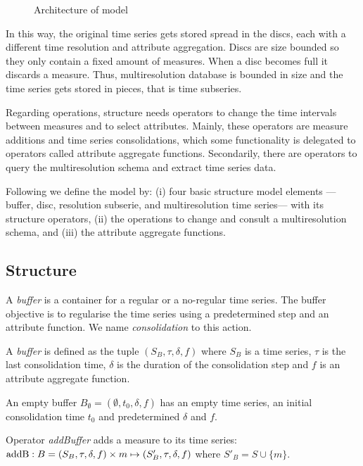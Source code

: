 \begin{figure}
  \centering
  
  \caption{Architecture of  model}
  \label{fig:model:mtsdb}
\end{figure}


In this way, the original time series gets stored spread in the discs,
each with a different time resolution and attribute aggregation.
Discs are size bounded so they only contain a fixed amount of
measures. When a disc becomes full it discards a measure. Thus,
multiresolution database is bounded in size and the time series gets
stored in pieces, that is time subseries.

Regarding operations,  structure needs operators to change
the time intervals between measures and to select attributes. Mainly,
these operators are measure additions and time series consolidations,
which some functionality is delegated to operators called attribute
aggregate functions. Secondarily, there are operators to query the
multiresolution schema and extract time series data.


Following we define the  model by: (i) four basic
structure model elements ---buffer, disc, resolution subserie, and
multiresolution time series--- with its structure operators, (ii) the
operations to change and consult a multiresolution schema, and (iii)
the attribute aggregate functions.



\subsection{Structure}

A \emph{buffer} is a container for a regular or a no-regular time
series. The buffer objective is to regularise the time series using a
predetermined step and an attribute function. We name
\emph{consolidation} to this action.
\begin{definition}[Buffer]
  A \emph{buffer} is defined as the tuple $(S_B,\tau,\delta,f)$ where
  $S_B$ is a time series, $\tau$ is the last consolidation time,
  $\delta$ is the duration of the consolidation step and $f$ is an
  attribute aggregate function.

  An empty buffer $B_{\emptyset} = (\emptyset,t_0, \delta, f)$ has an
  empty time series, an initial consolidation time $t_0$ and
  predetermined $\delta$ and $f$.
\end{definition}

Operator \emph{addBuffer} adds a measure to its time series:
$\operatorname{addB}: B = (S_B,\tau,\delta,f) \times m \mapsto
(S'_B,\tau,\delta,f)$ where $S'_B = S \cup \{m\} $.

